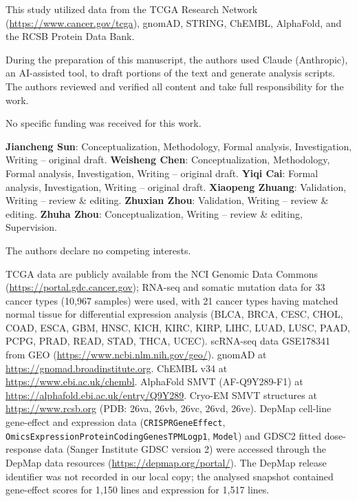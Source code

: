 \documentclass[pdflatex,sn-nature]{sn-jnl}
\begin{document}
\begin{backmatter}

This study utilized data from the TCGA Research Network (\url{https://www.cancer.gov/tcga}), gnomAD, STRING, ChEMBL, AlphaFold, and the RCSB Protein Data Bank.

During the preparation of this manuscript, the authors used Claude (Anthropic), an AI-assisted tool, to draft portions of the text and generate analysis scripts. The authors reviewed and verified all content and take full responsibility for the work.

No specific funding was received for this work.

\textbf{Jiancheng Sun}: Conceptualization, Methodology, Formal analysis, Investigation, Writing -- original draft. \textbf{Weisheng Chen}: Conceptualization, Methodology, Formal analysis, Investigation, Writing -- original draft. \textbf{Yiqi Cai}: Formal analysis, Investigation, Writing -- original draft. \textbf{Xiaopeng Zhuang}: Validation, Writing -- review \& editing. \textbf{Zhuxian Zhou}: Validation, Writing -- review \& editing. \textbf{Zhuha Zhou}: Conceptualization, Writing -- review \& editing, Supervision.

The authors declare no competing interests.

TCGA data are publicly available from the NCI Genomic Data Commons (\url{https://portal.gdc.cancer.gov}); RNA-seq and somatic mutation data for 33 cancer types (10,967 samples) were used, with 21 cancer types having matched normal tissue for differential expression analysis (BLCA, BRCA, CESC, CHOL, COAD, ESCA, GBM, HNSC, KICH, KIRC, KIRP, LIHC, LUAD, LUSC, PAAD, PCPG, PRAD, READ, STAD, THCA, UCEC). scRNA-seq data GSE178341 from GEO (\url{https://www.ncbi.nlm.nih.gov/geo/}). gnomAD at \url{https://gnomad.broadinstitute.org}. ChEMBL v34 at \url{https://www.ebi.ac.uk/chembl}. AlphaFold SMVT (AF-Q9Y289-F1) at \url{https://alphafold.ebi.ac.uk/entry/Q9Y289}. Cryo-EM SMVT structures at \url{https://www.rcsb.org} (PDB: 26va, 26vb, 26vc, 26vd, 26ve). DepMap cell-line gene-effect and expression data (\texttt{CRISPRGeneEffect}, \texttt{OmicsExpressionProteinCodingGenesTPMLogp1}, \texttt{Model}) and GDSC2 fitted dose-response data (Sanger Institute GDSC version 2) were accessed through the DepMap data resources (\url{https://depmap.org/portal/}). The DepMap release identifier was not recorded in our local copy; the analysed snapshot contained gene-effect scores for 1,150 lines and expression for 1,517 lines.


\end{backmatter}
\end{document}
